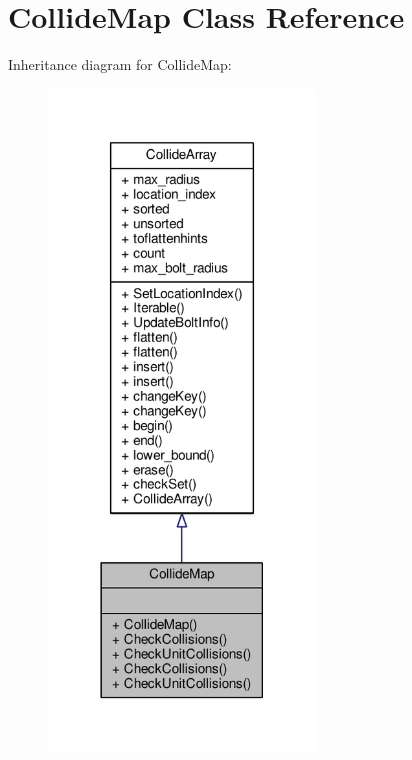 \hypertarget{classCollideMap}{}\section{Collide\+Map Class Reference}
\label{classCollideMap}


Inheritance diagram for Collide\+Map\+:
\nopagebreak
\begin{figure}[H]
\begin{center}
\leavevmode
\includegraphics[width=201pt]{db/d00/classCollideMap__inherit__graph}
\end{center}
\end{figure}


